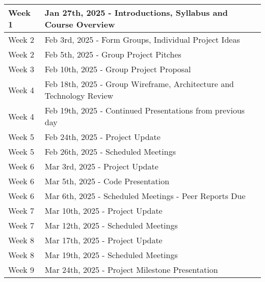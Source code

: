 \renewcommand{\arraystretch}{1.5}




\begin{tabular}{ | l | l |  }
    \hline
    Week 1 & Jan 27th, 2025 - Introductions, Syllabus and Course Overview \\
    \hline
    Week 2 & Feb 3rd, 2025 - Form Groups, Individual Project Ideas \\ 
    \hline
    Week 2 & Feb 5th, 2025 - Group Project Pitches  \\ 
    \hline
    Week 3 & Feb 10th, 2025 - Group Project Proposal \\ 
    \hline
    Week 4 & Feb 18th, 2025 - Group Wireframe, Architecture and Technology Review \\
    \hline
    Week 4 & Feb 19th, 2025 - Continued Presentations from previous day \\ %
    \hline
    Week 5 & Feb 24th, 2025 - Project Update \\ 
    \hline
    Week 5 & Feb 26th, 2025 - Scheduled Meetings \\ 
    \hline
    Week 6 & Mar 3rd, 2025 - Project Update \\ 
    \hline
    Week 6 & Mar 5th, 2025 - Code Presentation \\
    \hline
    Week 6 & Mar 6th, 2025 - Scheduled Meetings - Peer Reports Due \\ %
    \hline
    Week 7 & Mar 10th, 2025 - Project Update \\ 
    \hline
    Week 7 & Mar 12th, 2025 - Scheduled Meetings \\ 
    \hline
    Week 8 & Mar 17th, 2025 - Project Update \\ 
    \hline
    Week 8 & Mar 19th, 2025 - Scheduled Meetings \\ 
    \hline
    Week 9 & Mar 24th, 2025 - Project Milestone Presentation \\ 

\end{tabular}
